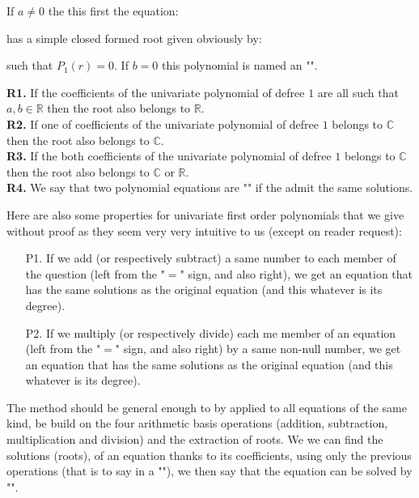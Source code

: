 	If $a\neq 0$ the this first the equation:
	
	has a simple closed formed root given obviously by:
	
	such that $P_1(r)=0$.
	If $b=0$ this polynomial is named an "".
	
	\begin{tcolorbox}[title=Remarks,colframe=black,arc=10pt]
	\textbf{R1.} If the coefficients of the univariate polynomial of defree $1$ are all such that  $a,b\in \mathbb{R}$ then the root also belongs to $\mathbb{R}$.\\
	
	\textbf{R2.} If one of coefficients of the univariate polynomial of defree $1$ belongs to $\mathbb{C}$ then the root also belongs to $\mathbb{C}$.\\
	
	\textbf{R3.} If the both coefficients of the univariate polynomial of defree $1$ belongs to $\mathbb{C}$ then the root also belongs to $\mathbb{C}$ or $\mathbb{R}$.\\
	
	\textbf{R4.} We say that two polynomial equations are "" if the admit the same solutions.
	\end{tcolorbox}
	Here are also some properties for univariate first order polynomials that we give without proof as they seem very very intuitive to us (except on reader request):
	\begin{enumerate}
		\item[P1.] If we add (or respectively subtract) a same number to each member of the question (left from the "$=$" sign, and also right), we get an equation that has the same solutions as the original equation (and this whatever is its degree).
	
		\item[P2.] If we multiply (or respectively divide) each me member of an equation (left from the "$=$" sign, and also right) by a same non-null number, we get an equation that has the same solutions as the original equation (and this whatever is its degree).
	\end{enumerate}
	The method should be general enough to by applied to all equations of the same kind, be build on the four arithmetic basis operations (addition, subtraction, multiplication and division) and the extraction of roots. We we can find the solutions (roots), of an equation thanks to its coefficients, using only the previous operations (that is to say in a ""), we then say that the equation can be solved by "".
	
